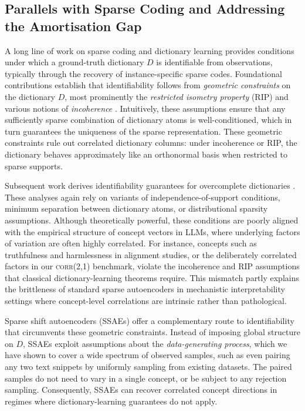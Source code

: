 \documentclass{article}
\begin{document}
\subsection{Parallels with Sparse Coding and Addressing the Amortisation Gap}
\label{apx:dict-vs-ssae}

A long line of work on sparse coding and dictionary learning provides conditions under which a ground-truth dictionary $D$ is identifiable from observations, typically through the recovery of instance-specific sparse codes. Foundational contributions establish that identifiability follows from \emph{geometric constraints} on the dictionary $D$, most prominently the \emph{restricted isometry property} (RIP) \citep{candes2005decodinglinearprogramming, candes2005stablesignalrecoveryincomplete, baraniuk2008simple, foucart2013invitation} and various notions of \emph{incoherence} \citep{1614066, donoho2003optimally, gribonval2004sparse, 1337101}. Intuitively, these assumptions ensure that any sufficiently sparse combination of dictionary atoms is well-conditioned, which in turn guarantees the uniqueness of the sparse representation. These geometric constraints rule out correlated dictionary columns: under incoherence or RIP, the dictionary behaves approximately like an orthonormal basis when restricted to sparse supports.

Subsequent work derives identifiability guarantees for overcomplete dictionaries \citep{spielman2012exactrecoverysparselyuseddictionaries, agarwal2014learningsparselyusedovercomplete, gribonval2015sample, schnass2015localidentificationovercompletedictionaries}. These analyses again rely on variants of independence-of-support conditions, minimum separation between dictionary atoms, or distributional sparsity assumptions. Although theoretically powerful, these conditions are poorly aligned with the empirical structure of concept vectors in LLMs, where underlying factors of variation are often highly correlated. For instance, concepts such as truthfulness and harmlessness in alignment studies, or the deliberately correlated factors in our \textsc{corr}(2,1) benchmark, violate the incoherence and RIP assumptions that classical dictionary-learning theorems require. This mismatch partly explains the brittleness of standard sparse autoencoders in mechanistic interpretability settings where concept-level correlations are intrinsic rather than pathological.

Sparse shift autoencoders (SSAEs) offer a complementary route to identifiability that circumvents these geometric constraints. Instead of imposing global structure on $D$, SSAEs exploit assumptions about the \emph{data-generating process}, which we have shown to cover a wide spectrum of observed samples, such as even pairing any two text snippets by uniformly sampling from existing datasets. The paired samples do not need to vary in a single concept, or be subject to any rejection sampling. Consequently, SSAEs can recover correlated concept directions in regimes where dictionary-learning guarantees do not apply.
\end{document}
